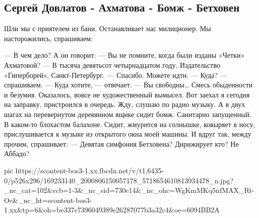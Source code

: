  
 
 
 
 

\subsection{Сергей Довлатов - Ахматова - Бомж - Бетховен}

Шли мы с приятелем из бани. Останавливает нас милиционер. Мы насторожились, спрашиваем:

— В чем дело?
А он говорит:
— Вы не помните, когда были изданы «Четки» Ахматовой?
— В тысяча девятьсот четырнадцатом году. Издательство «Гиперборей», Санкт-Петербург.
— Спасибо. Можете идти.
— Куда? — спрашиваем.
— Куда хотите, — отвечает. — Вы свободны…
Смесь обыденности и безумия. Оказалось, вовсе не художественный вымысел. Вот заехал я сегодня на заправку, пристроился в очередь. Жду, слушаю по радио музыку. А в двух шагах на перевернутом деревянном ящике сидит бомж. Санитарно запущенный. В каком-то блохастом балахоне. Сидит, жмурится на солнышке, ковыряет в носу, прислушивается к музыке из открытого окна моей машины. И вдруг так, между прочим, спрашивает:
— Девятая симфония Бетховена? Дирижирует кто? Не Аббадо?

\ifcmt
  pic https://scontent-bos3-1.xx.fbcdn.net/v/t1.6435-0/p526x296/169233140_2000806150057178_5718654610813934478_n.jpg?_nc_cat=102&ccb=1-3&_nc_sid=730e14&_nc_ohc=WgKmMKq5nfMAX_Rt-Oc&_nc_ht=scontent-bos3-1.xx&tp=6&oh=be337c7396049389e26287077b3a32c4&oe=6094BB2A
\fi

